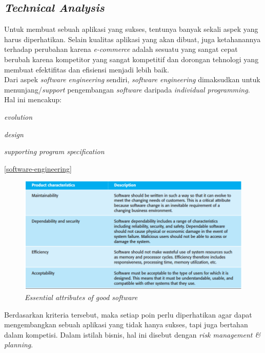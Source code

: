 
	\subsection{\textit{Technical Analysis}}
	\label{tech-analysis}
	
	Untuk membuat sebuah aplikasi yang sukses, tentunya banyak sekali aspek yang harus diperhatikan. Selain kualitas aplikasi yang akan dibuat, juga ketahanannya terhadap perubahan karena \textit{e-commerce} adalah sesuatu yang sangat cepat berubah karena kompetitor yang sangat kompetitif dan dorongan tehnologi yang membuat efektifitas dan efisiensi menjadi lebih baik.\\
	
	\indent Dari aspek \textit{software engineering} sendiri, \textit{software engineering} dimaksudkan untuk menunjang/\textit{support} pengembangan \textit{software} daripada \textit{individual programming}. Hal ini mencakup: \begin{inlinelist}
		\item \textit{evolution}
		\item \textit{design}
		\item \textit{supporting program specification}
	\end{inlinelist} \ref{software-engineering}
	
	\begin{figure}[H]
		\centering
		\includegraphics[width=\textwidth]{images/bab3/buku/essential-good-software.png}
		\caption{\textit{Essential attributes of good software}}
		\label{essential-software}
	\end{figure}
	
	\indent Berdasarkan kriteria tersebut, maka setiap poin perlu diperhatikan agar dapat mengembangkan sebuah aplikasi yang tidak hanya sukses, tapi juga bertahan dalam kompetisi. Dalam istilah bisnis, hal ini disebut dengan \textit{risk management \& planning}.
	

